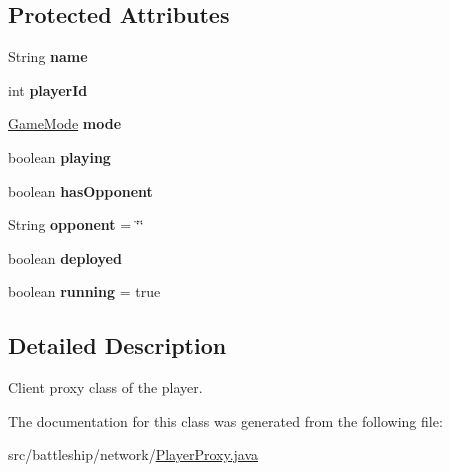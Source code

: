 \subsection*{Protected Attributes}
\begin{DoxyCompactItemize}
\item 
\hypertarget{classbattleship_1_1network_1_1PlayerProxy_af56071dec76443202ccba97fe464878e}{}String {\bfseries name}\label{classbattleship_1_1network_1_1PlayerProxy_af56071dec76443202ccba97fe464878e}

\item 
\hypertarget{classbattleship_1_1network_1_1PlayerProxy_a6c790c6b7ca9c9217a86b922c3561d42}{}int {\bfseries player\+Id}\label{classbattleship_1_1network_1_1PlayerProxy_a6c790c6b7ca9c9217a86b922c3561d42}

\item 
\hypertarget{classbattleship_1_1network_1_1PlayerProxy_a04a55a2889398447c80fef059e1d8a1b}{}\hyperlink{enumbattleship_1_1game_1_1GameMode}{Game\+Mode} {\bfseries mode}\label{classbattleship_1_1network_1_1PlayerProxy_a04a55a2889398447c80fef059e1d8a1b}

\item 
\hypertarget{classbattleship_1_1network_1_1PlayerProxy_a2a863508e38e4cd0db67228ab5163248}{}boolean {\bfseries playing}\label{classbattleship_1_1network_1_1PlayerProxy_a2a863508e38e4cd0db67228ab5163248}

\item 
\hypertarget{classbattleship_1_1network_1_1PlayerProxy_aeeb9899b054ab7ab0d9a88b3243b162a}{}boolean {\bfseries has\+Opponent}\label{classbattleship_1_1network_1_1PlayerProxy_aeeb9899b054ab7ab0d9a88b3243b162a}

\item 
\hypertarget{classbattleship_1_1network_1_1PlayerProxy_a78dcfe37587e0169c01fbb16c26d1da7}{}String {\bfseries opponent} = \char`\"{}\char`\"{}\label{classbattleship_1_1network_1_1PlayerProxy_a78dcfe37587e0169c01fbb16c26d1da7}

\item 
\hypertarget{classbattleship_1_1network_1_1PlayerProxy_a3b657e6985afe4624e230be29d5ebaf8}{}boolean {\bfseries deployed}\label{classbattleship_1_1network_1_1PlayerProxy_a3b657e6985afe4624e230be29d5ebaf8}

\item 
\hypertarget{classbattleship_1_1network_1_1PlayerProxy_a54e7c20ba8031adb706784c02e37a7f5}{}boolean {\bfseries running} = true\label{classbattleship_1_1network_1_1PlayerProxy_a54e7c20ba8031adb706784c02e37a7f5}

\end{DoxyCompactItemize}


\subsection{Detailed Description}
Client proxy class of the player. 

The documentation for this class was generated from the following file\+:\begin{DoxyCompactItemize}
\item 
src/battleship/network/\hyperlink{PlayerProxy_8java}{Player\+Proxy.\+java}\end{DoxyCompactItemize}
